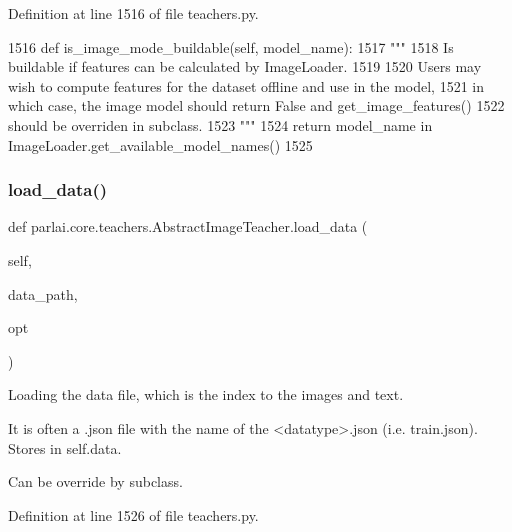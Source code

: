 Definition at line 1516 of file teachers.\+py.


\begin{DoxyCode}
1516     \textcolor{keyword}{def }is\_image\_mode\_buildable(self, model\_name):
1517         \textcolor{stringliteral}{"""}
1518 \textcolor{stringliteral}{        Is buildable if features can be calculated by ImageLoader.}
1519 \textcolor{stringliteral}{}
1520 \textcolor{stringliteral}{        Users may wish to compute features for the dataset offline and use in the model,}
1521 \textcolor{stringliteral}{        in which case, the image model should return False and get\_image\_features()}
1522 \textcolor{stringliteral}{        should be overriden in subclass.}
1523 \textcolor{stringliteral}{        """}
1524         \textcolor{keywordflow}{return} model\_name \textcolor{keywordflow}{in} ImageLoader.get\_available\_model\_names()
1525 
\end{DoxyCode}
\mbox{\label{classparlai_1_1core_1_1teachers_1_1AbstractImageTeacher_ad110a80a077e9e1135d4241083786199}} 
\subsubsection{\texorpdfstring{load\+\_\+data()}{load\_data()}}
{\footnotesize\ttfamily def parlai.\+core.\+teachers.\+Abstract\+Image\+Teacher.\+load\+\_\+data (\begin{DoxyParamCaption}\item[{}]{self,  }\item[{}]{data\+\_\+path,  }\item[{}]{opt }\end{DoxyParamCaption})}

\begin{DoxyVerb}Loading the data file, which is the index to the images and text.

It is often a .json file with the name of the <datatype>.json (i.e.
train.json). Stores in self.data.

Can be override by subclass.
\end{DoxyVerb}
 

Definition at line 1526 of file teachers.\+py.


